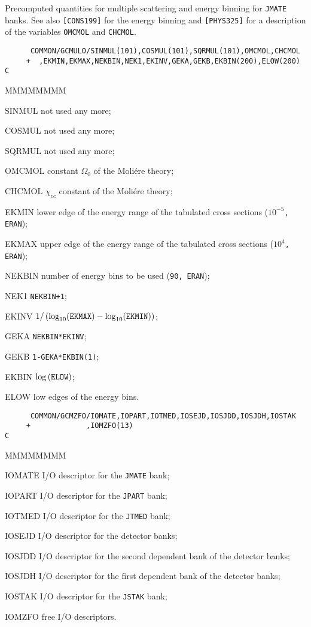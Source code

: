 Precomputed quantities for multiple scattering and energy binning for
{\tt JMATE} banks. See also {\tt [CONS199]} for the energy binning and
{\tt [PHYS325]} for a description of the variables {\tt OMCMOL} and
{\tt CHCMOL}.
\begin{verbatim}
      COMMON/GCMULO/SINMUL(101),COSMUL(101),SQRMUL(101),OMCMOL,CHCMOL
     +  ,EKMIN,EKMAX,NEKBIN,NEK1,EKINV,GEKA,GEKB,EKBIN(200),ELOW(200)
C
\end{verbatim}
\begin{DLtt}{MMMMMMMM}
\item[SINMUL]  not used any more;
\item[COSMUL]  not used any more;
\item[SQRMUL]  not used any more;
\item[OMCMOL]  constant $\Omega_0$ of the Moli\'ere theory;
\item[CHCMOL]  $\chi_{cc}$ constant of the Moli\'ere theory;
\item[EKMIN]   lower edge of the energy range of the tabulated cross
sections ({\tt $10^{-5}$, ERAN});
\item[EKMAX]   upper edge of the energy range of the tabulated cross
sections ({\tt $10^{4}$, ERAN});
\item[NEKBIN]    number of energy bins to be used ({\tt 90, ERAN});
\item[NEK1]    {\tt NEKBIN+1};
\item[EKINV]   $1/ \left ( \log_{10}(\mbox{\tt EKMAX})-
\log_{10}(\mbox{\tt EKMIN}) \right )$;
\item[GEKA]    {\tt NEKBIN*EKINV};
\item[GEKB]    {\tt 1-GEKA*EKBIN(1)};
\item[EKBIN]   $\log \left ( \mbox{\tt ELOW} \right ) $;
\item[ELOW]    low edges of the energy bins.
\end{DLtt}
\begin{verbatim}
      COMMON/GCMZFO/IOMATE,IOPART,IOTMED,IOSEJD,IOSJDD,IOSJDH,IOSTAK
     +             ,IOMZFO(13)
C
\end{verbatim}
\begin{DLtt}{MMMMMMMM}
\item[IOMATE] I/O descriptor for the {\tt JMATE} bank;
\item[IOPART] I/O descriptor for the {\tt JPART} bank;
\item[IOTMED] I/O descriptor for the {\tt JTMED} bank;
\item[IOSEJD] I/O descriptor for the detector banks;
\item[IOSJDD] I/O descriptor for the second dependent bank of the
detector banks;
\item[IOSJDH] I/O descriptor for the first dependent bank of the
detector banks;
\item[IOSTAK] I/O descriptor for the {\tt JSTAK} bank;
\item[IOMZFO] free I/O descriptors.
\end{DLtt}
